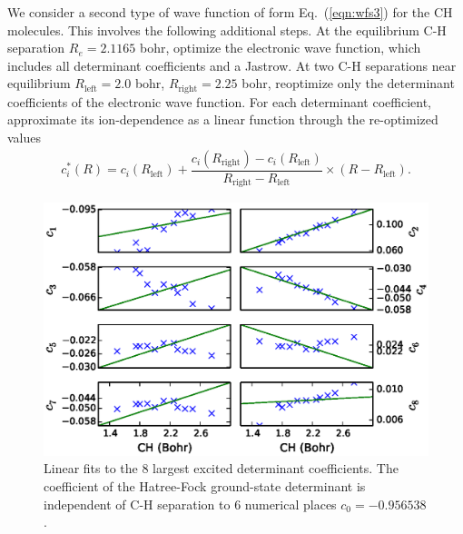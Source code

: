 \documentclass[aip,jcp,numerical,reprint]{revtex4-1}
\begin{document}
We consider a second type of wave function of form Eq.~(\ref{eqn:wfs3}) for the CH molecules.  This involves the following additional steps. At the equilibrium C-H separation $R_e=2.1165$ bohr, optimize the electronic wave function, which includes all determinant coefficients and a Jastrow. At two C-H separations near equilibrium $R_{\text{left}}=2.0$ bohr, $R_{\text{right}}=2.25$ bohr, reoptimize only the determinant coefficients of the electronic wave function. For each determinant coefficient, approximate its ion-dependence as a linear function through the re-optimized values
\begin{align}
c_i^*(R) = c_i(R_{\text{left}}) + 
\dfrac{c_i(R_{\text{right}}) - c_i(R_{\text{left}})}{R_{\text{right}}-R_{\text{left}}}\times(R-R_{\text{left}}). \label{eq:interpolation}
\end{align}

\begin{figure}[h]
\includegraphics[scale=0.5]{figures/two-point-fit}
\caption{Linear fits to the 8 largest excited determinant coefficients. The coefficient of the Hatree-Fock ground-state determinant is independent of C-H separation to 6 numerical places $c_0=-0.956538$.}
\end{figure}
\end{document}
